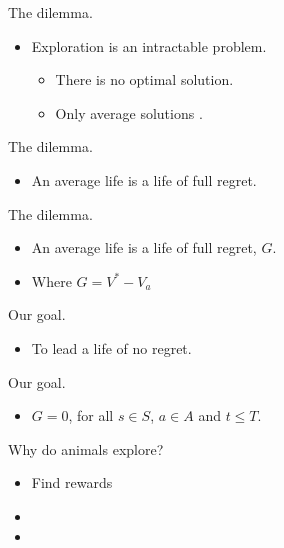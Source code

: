 \documentclass[10pt]{beamer}
\begin{document}
\begin{frame}[fragile]{The dilemma.}
\begin{itemize}
    \item Exploration is an intractable problem.
    \begin{itemize}
    \item There is no optimal solution.
    \item Only average solutions \cite{Thrun1992a,Dayan1996,Findling2018,Gershman2018b}.
    \end{itemize}
\end{itemize}
\end{frame}

\begin{frame}[fragile]{The dilemma.}
\begin{itemize}
    \item An average life is a life of full regret.
\end{itemize}
\end{frame}

\begin{frame}[fragile]{The dilemma.}
\begin{itemize}
    \item An average life is a life of full regret, $G$.
    \item Where $G = V^* - V_a$
\end{itemize}
\end{frame}

\begin{frame}[fragile]{Our goal.}
\begin{itemize}
    \item To lead a life of no regret.
\end{itemize}
\end{frame}

\begin{frame}[fragile]{Our goal.}
\begin{itemize}
    \item $G=0$, for all $s \in S$, $a \in A$ and $t \leq T$.
\end{itemize}
\end{frame}

\begin{frame}[fragile]{Why do animals explore?}
\begin{itemize}
    \item Find rewards
    \item 
    \item
\end{itemize}
\end{frame}
\end{document}
